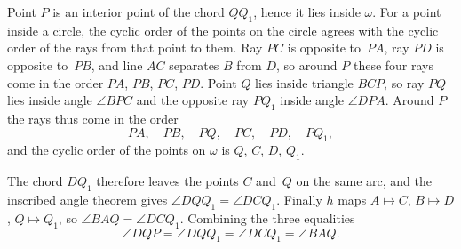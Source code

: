 {    Point $P$ is an interior point of the chord $QQ_1$, hence it lies inside $\omega$. For a point inside a circle, the cyclic order of the points on the circle agrees with the cyclic order of the rays from that point to them. Ray $PC$ is opposite to~$PA$, ray $PD$ is opposite to~$PB$, and line $AC$ separates $B$ from $D$, so around $P$ these four rays come in the order $PA$, $PB$, $PC$, $PD$. Point $Q$ lies inside triangle $BCP$, so ray $PQ$ lies inside angle $\angle BPC$ and the opposite ray $PQ_1$ inside angle $\angle DPA$. Around $P$ the rays thus come in the order
    $$
    PA, \quad PB, \quad PQ, \quad PC, \quad PD, \quad PQ_1,
    $$
    and the cyclic order of the points on $\omega$ is $Q$, $C$, $D$, $Q_1$.

    The chord $DQ_1$ therefore leaves the points $C$ and~$Q$ on the same arc, and the inscribed angle theorem gives $\angle DQQ_1 = \angle DCQ_1$. Finally $h$ maps $A \mapsto C$, $B \mapsto D$, $Q \mapsto Q_1$, so $\angle BAQ = \angle DCQ_1$. Combining the three equalities
    $$
    \angle DQP = \angle DQQ_1 = \angle DCQ_1 = \angle BAQ.
    $$
}

